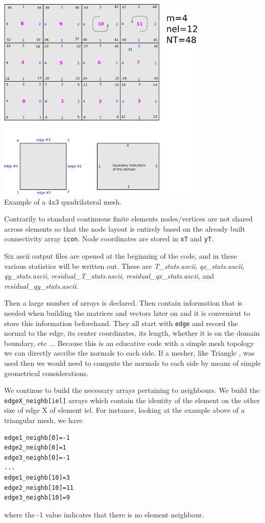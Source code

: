 \begin{center}
\includegraphics[width=10cm]{python_codes/fieldstone_79/images/grids2D_quads}\\
{\captionfont Example of a 4x3 quadrilateral mesh.}
\end{center}

Contrarily to standard continuous finite elements nodes/vertices are not 
shared across elements so that the node layout is entirely based on the 
already built connectivity array {\tt icon}. Node coordinates are stored in 
{\tt xT} and {\tt yT}.

Six ascii output files are opened at the beginning of the code, and in these 
various statistics will be written out. These are 
{\sl T\_stats.ascii}, {\sl qx\_stats.ascii}, {\sl qy\_stats.ascii},
{\sl residual\_T\_stats.ascii}, {\sl residual\_qx\_stats.ascii}, and {\sl residual\_qy\_stats.ascii}.

Then a large number of arrays is declared. Then contain information that is needed 
when building the matrices and vectors later on and it is convenient to store this information
beforehand. They all start with {\tt edge} and record the normal to the edge, its center coordinates, 
its length, whether it is on the domain boundary, etc ... Because this is an educative code 
with a simple mesh topology we can directly ascribe the normals to each side. If a mesher, like 
Triangle \cite{shew14}, was used then we would need to compute the normals to each side by means
of simple geometrical considerations.

We continue to build the necessary arrays pertaining to neighbours. 
We build the {\tt edgeX\_neighb[iel]} arrays which contain the identity of the element 
on the other size of edge X of element iel.
For instance, looking at the example above of a triangular mesh, we have
\begin{lstlisting}
edge1_neighb[0]=-1
edge2_neighb[0]=1
edge3_neighb[0]=-1
...
edge1_neighb[10]=3
edge2_neighb[10]=11
edge3_neighb[10]=9
\end{lstlisting}
where the -1 value indicates that there is no element neighbour.

